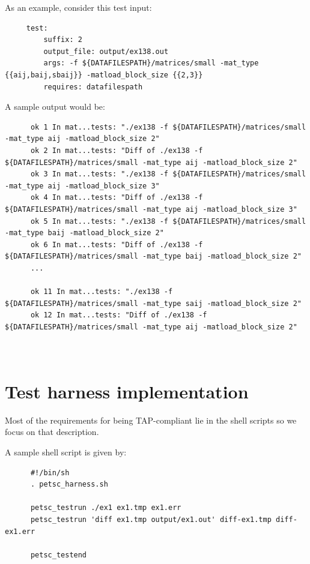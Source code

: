 As an example, consider this test input:
%
\begin{verbatim}
     test:
         suffix: 2
         output_file: output/ex138.out
         args: -f ${DATAFILESPATH}/matrices/small -mat_type {{aij,baij,sbaij}} -matload_block_size {{2,3}}
         requires: datafilespath
\end{verbatim}

A sample output would be:
%
\begin{verbatim}
      ok 1 In mat...tests: "./ex138 -f ${DATAFILESPATH}/matrices/small -mat_type aij -matload_block_size 2"
      ok 2 In mat...tests: "Diff of ./ex138 -f ${DATAFILESPATH}/matrices/small -mat_type aij -matload_block_size 2"
      ok 3 In mat...tests: "./ex138 -f ${DATAFILESPATH}/matrices/small -mat_type aij -matload_block_size 3"
      ok 4 In mat...tests: "Diff of ./ex138 -f ${DATAFILESPATH}/matrices/small -mat_type aij -matload_block_size 3"
      ok 5 In mat...tests: "./ex138 -f ${DATAFILESPATH}/matrices/small -mat_type baij -matload_block_size 2"
      ok 6 In mat...tests: "Diff of ./ex138 -f ${DATAFILESPATH}/matrices/small -mat_type baij -matload_block_size 2"
      ...

      ok 11 In mat...tests: "./ex138 -f ${DATAFILESPATH}/matrices/small -mat_type saij -matload_block_size 2"
      ok 12 In mat...tests: "Diff of ./ex138 -f ${DATAFILESPATH}/matrices/small -mat_type aij -matload_block_size 2"



\end{verbatim}


\section{Test harness implementation%
  \label{test-harness-implementation}%
}

Most of the requirements for being TAP-compliant lie in the shell
scripts so we focus on that description.

A sample shell script is given by:
%
\begin{verbatim}
      #!/bin/sh
      . petsc_harness.sh

      petsc_testrun ./ex1 ex1.tmp ex1.err
      petsc_testrun 'diff ex1.tmp output/ex1.out' diff-ex1.tmp diff-ex1.err

      petsc_testend
\end{verbatim}

